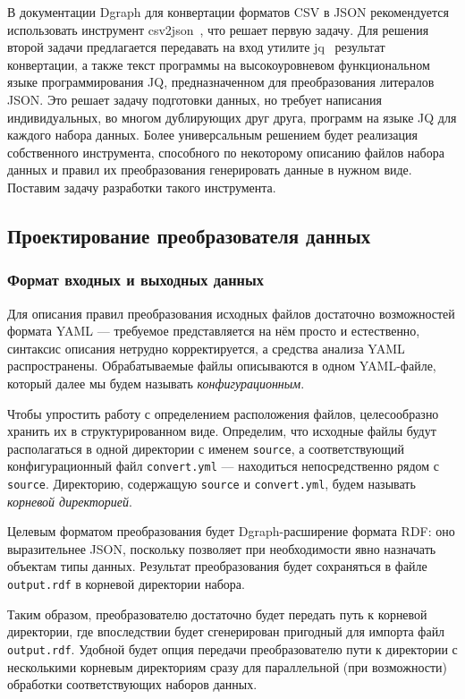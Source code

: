 В документации Dgraph для конвертации форматов CSV в JSON рекомендуется использовать инструмент csv2json~\cite{csv2json},
что решает первую задачу. Для решения второй задачи предлагается передавать на вход утилите jq~\cite{jq} результат
конвертации, а также текст программы на высокоуровневом функциональном языке программирования JQ, предназначенном для
преобразования литералов JSON. Это решает задачу подготовки данных, но требует написания индивидуальных, во многом
дублирующих друг друга, программ на языке JQ для каждого набора данных. Более универсальным решением будет реализация
собственного инструмента, способного по некоторому описанию файлов набора данных и правил их преобразования генерировать
данные в нужном виде. Поставим задачу разработки такого инструмента.

\subsection{Проектирование преобразователя данных}

\subsubsection{Формат входных и выходных данных}

Для описания правил преобразования исходных файлов достаточно возможностей формата YAML --- требуемое представляется на
нём просто и естественно, синтаксис описания нетрудно корректируется, а средства анализа YAML распространены.
Обрабатываемые файлы описываются в одном YAML-файле, который далее мы будем называть \textit{конфигурационным}.

Чтобы упростить работу с определением расположения файлов, целесообразно хранить их в структурированном виде. Определим,
что исходные файлы будут располагаться в одной директории с именем \texttt{source}, а соответствующий конфигурационный
файл \texttt{convert.yml} --- находиться непосредственно рядом с \texttt{source}. Директорию, содержащую \texttt{source}
и \texttt{convert.yml}, будем называть \textit{корневой директорией}.

Целевым форматом преобразования будет Dgraph-расширение формата RDF: оно выразительнее JSON, поскольку позволяет при
необходимости явно назначать объектам типы данных. Результат преобразования будет сохраняться в файле \texttt{output.rdf}
в корневой директории набора.

Таким образом, преобразователю достаточно будет передать путь к корневой директории, где впоследствии будет сгенерирован
пригодный для импорта файл \texttt{output.rdf}. Удобной будет опция передачи преобразователю пути к директории с несколькими
корневым директориям сразу для параллельной (при возможности) обработки соответствующих наборов данных.

